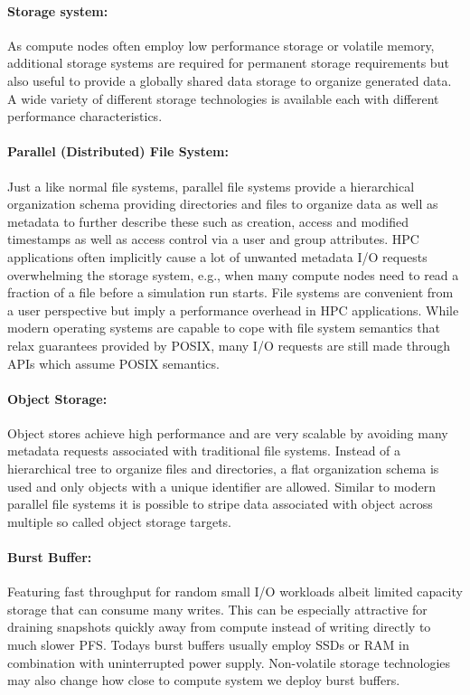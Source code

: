 \paragraph{Storage system:}
As compute nodes often employ low performance storage or volatile memory, additional storage systems are required for permanent storage requirements but also useful to provide a globally shared data storage to organize generated data.
A wide variety of different storage technologies is available each with different performance characteristics.


\paragraph{Parallel (Distributed) File System:}
Just a like normal file systems, parallel file systems provide a hierarchical organization schema providing directories and files to organize data as well as metadata to further describe these such as creation, access and modified timestamps as well as access control via a user and group attributes.
HPC applications often implicitly cause a lot of unwanted metadata I/O requests overwhelming the storage system, e.g., when many compute nodes need to read a fraction of a file before a simulation run starts.
File systems are convenient from a user perspective but imply a performance overhead in HPC applications.
While modern operating systems are capable to cope with file system semantics that relax guarantees provided by POSIX, many I/O requests are still made through APIs which assume POSIX semantics.


\paragraph{Object Storage:}
Object stores achieve high performance and are very scalable by avoiding many metadata requests associated with traditional file systems.
Instead of a hierarchical tree to organize files and directories, a flat organization schema is used and only objects with a unique identifier are allowed.
Similar to modern parallel file systems it is possible to stripe data associated with object across multiple so called object storage targets.



\paragraph{Burst Buffer:} Featuring fast throughput for random small I/O workloads albeit limited capacity storage that can consume many writes.
This can be especially attractive for draining snapshots quickly away from compute instead of writing directly to much slower PFS.
Todays burst buffers usually employ SSDs or RAM in combination with uninterrupted power supply.
Non-volatile storage technologies may also change how close to compute system we deploy burst buffers.



